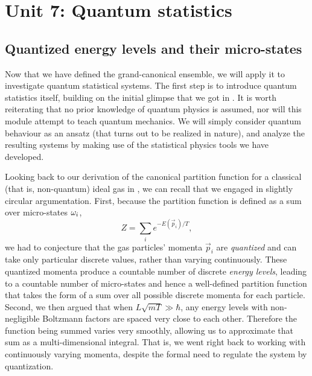 \renewcommand{\thisunit}{MATH327 Unit 7}
\renewcommand{\moddate}{Last modified 13 Mar.~2022}
\setcounter{section}{7}
\setcounter{subsection}{0}
{}
\section*{Unit 7: Quantum statistics}
\subsection{\label{sec:quantum}Quantized energy levels and their micro-states}
Now that we have defined the grand-canonical ensemble, we will apply it to investigate quantum statistical systems.
The first step is to introduce quantum statistics itself, building on the initial glimpse that we got in .
It is worth reiterating that no prior knowledge of quantum physics is assumed, nor will this module attempt to teach quantum mechanics.
We will simply consider quantum behaviour as an ansatz (that turns out to be realized in nature), and analyze the resulting systems by making use of the statistical physics tools we have developed.

Looking back to our derivation of the canonical partition function for a classical (that is, non-quantum) ideal gas in , we can recall that we engaged in slightly circular argumentation.
First, because the partition function is defined as a sum over micro-states $\omega_i$,
\begin{equation*}
  Z = \sum_i e^{-E(\vec{p}_i) / T},
\end{equation*}
we had to conjecture that the gas particles' momenta $\vec{p}_i$ are \textit{quantized} and can take only particular discrete values, rather than varying continuously.
These quantized momenta produce a countable number of discrete \textit{energy levels}, leading to a countable number of micro-states and hence a well-defined partition function that takes the form of a sum over all possible discrete momenta for each particle.
Second, we then argued that when $L\sqrt{mT} \gg \hbar$, any energy levels with non-negligible Boltzmann factors are spaced very close to each other.
Therefore the function being summed varies very smoothly, allowing us to approximate that sum as a multi-dimensional integral.
That is, we went right back to working with continuously varying momenta, despite the formal need to regulate the system by quantization.

